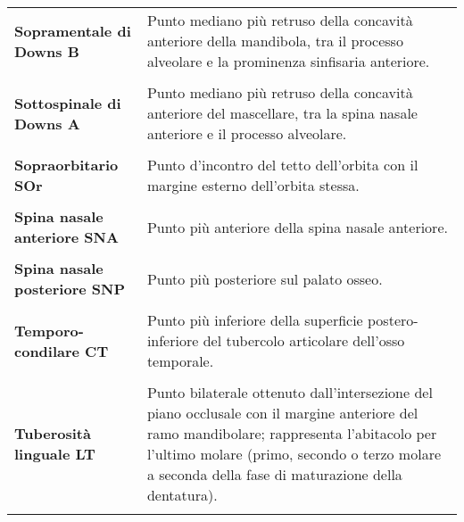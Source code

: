 \begin{longtable}{>{\bfseries}p{5cm}X}
Sopramentale di Downs \newline B & Punto mediano più retruso della concavità anteriore della mandibola, tra il processo alveolare e la prominenza sinfisaria anteriore.\\\\
Sottospinale di Downs \newline A & Punto mediano più retruso della concavità anteriore del mascellare, tra la spina nasale anteriore e il processo alveolare.\\\\
Sopraorbitario \newline SOr & Punto d'incontro del tetto dell'orbita con il margine esterno dell'orbita stessa.\\\\
Spina nasale anteriore \newline SNA & Punto più anteriore della spina nasale anteriore.\\\\
Spina nasale posteriore \newline SNP & Punto più posteriore sul palato osseo.\\\\
Temporo-condilare \newline CT & Punto più inferiore della superficie postero-inferiore del tubercolo articolare dell'osso temporale.\\\\
Tuberosità linguale \newline LT & Punto bilaterale ottenuto dall'intersezione del piano occlusale con il margine anteriore del ramo mandibolare; rappresenta l'abitacolo per l'ultimo molare (primo, secondo o terzo molare a seconda della fase di maturazione della dentatura).\\\\
\end{longtable}
